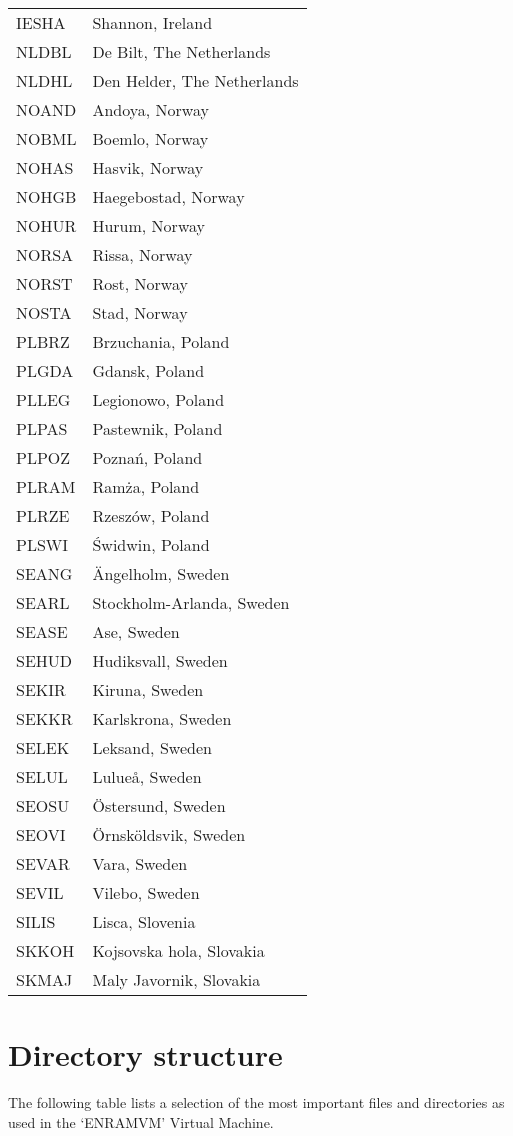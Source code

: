 \begin{longtable}[htb]{ll}
IESHA & Shannon, Ireland  \\
NLDBL & De Bilt, The Netherlands     \\
NLDHL & Den Helder, The Netherlands \\
NOAND & Andoya, Norway \\
NOBML & Boemlo, Norway \\
NOHAS & Hasvik, Norway \\
NOHGB & Haegebostad, Norway \\
NOHUR & Hurum, Norway \\
NORSA & Rissa, Norway \\
NORST & Rost, Norway \\
NOSTA & Stad, Norway \\
PLBRZ & Brzuchania, Poland \\
PLGDA & Gdansk, Poland \\
PLLEG & Legionowo, Poland \\
PLPAS & Pastewnik, Poland \\
PLPOZ & Pozna\'{n}, Poland \\
PLRAM & Ram\.{z}a, Poland \\
PLRZE & Rzesz\'{o}w, Poland \\
PLSWI & \'{S}widwin, Poland \\
SEANG & \"{A}ngelholm, Sweden \\
SEARL & Stockholm-Arlanda, Sweden \\
SEASE & Ase, Sweden \\
SEHUD & Hudiksvall, Sweden \\
SEKIR & Kiruna, Sweden \\
SEKKR & Karlskrona, Sweden \\
SELEK & Leksand, Sweden \\
SELUL & Lulue\r{a}, Sweden \\
SEOSU & \"{O}stersund, Sweden \\
SEOVI & \"{O}rnsk\"{o}ldsvik, Sweden \\
SEVAR & Vara, Sweden \\
SEVIL & Vilebo, Sweden \\
SILIS & Lisca, Slovenia \\
SKKOH & Kojsovska hola, Slovakia \\
SKMAJ & Maly Javornik, Slovakia\\
\end{longtable}

\needspace{10em}
\section{Directory structure}
The following table lists a selection of the most important files and directories as used in the \mbox{`ENRAMVM'} Virtual Machine.

